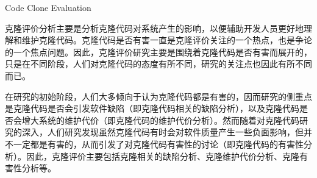 {Code Clone Evaluation}

克隆评价分析主要是分析克隆代码对系统产生的影响，以便辅助开发人员更好地理解和维护克隆代码。克隆代码是否有害一直是克隆评价关注的一个热点，也是争论的一个焦点问题。因此，克隆评价研究主要是围绕着克隆代码是否有害而展开的，只是在不同阶段，人们对克隆代码的态度有所不同，研究的关注点也因此有所不同而已。

在研究的初始阶段，人们大多倾向于认为克隆代码都是有害的，因而研究的侧重点是克隆代码是否会引发软件缺陷（即克隆代码相关的缺陷分析），以及克隆代码是否会增大系统的维护代价（即克隆代码的维护代价分析）。然而随着对克隆代码研究的深入，人们研究发现虽然克隆代码有时会对软件质量产生一些负面影响，但并不一定都是有害的，从而引发了对克隆代码有害性的讨论（即克隆代码的有害性分析）。因此，克隆评价主要包括克隆相关的缺陷分析、克隆维护代价分析、克隆有害性分析等。



